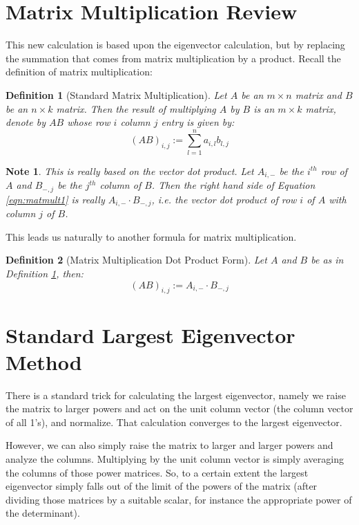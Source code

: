 \documentclass[12pt]{article}
\newtheorem{definition}{Definition}
\newtheorem{note}{Note}
\begin{document}
\section{Matrix Multiplication Review}
This new calculation is based upon the eigenvector calculation, but by replacing
the summation that comes from matrix multiplication by a product.  Recall
the definition of matrix multiplication:
\begin{definition}[Standard Matrix Multiplication]
\label{defn:matmult1}
Let $A$ be an $m \times n$ matrix and $B$ be an $n \times k$ matrix.  
Then the result of multiplying $A$ by $B$ is an $m \times k$ matrix,
denote by $AB$ whose row $i$ column $j$ entry is given by:
\begin{equation}
(AB)_{i,j} := \sum_{l=1}^{n} a_{i,l}b_{l,j}
\label{eqn:matmult1}	
\end{equation}
\end{definition}
\begin{note}
\label{note:matmultdot}
	This is really based on the vector dot product.  Let $A_{i,-}$
	be the $i^{th}$ row of $A$ and $B_{-,j}$ be the $j^{th}$ column of
	$B$.  Then the right hand side of Equation \ref{eqn:matmult1} is
	really $A_{i,-} \cdot B_{-,j}$, i.e. the vector dot product of
	row $i$ of $A$ with column $j$ of $B$.
\end{note}
This leads us naturally to another formula for matrix multiplication.

\begin{definition}[Matrix Multiplication Dot Product Form]
\label{defn:matmult2}
	Let $A$ and $B$ be as in Definition \ref{defn:matmult1}, then:
	$$(AB)_{i,j} := A_{i,-} \cdot B_{-,j}$$
\end{definition}

\section{Standard Largest Eigenvector Method}
There is a standard trick for calculating the largest eigenvector, namely
we raise the matrix to larger powers and act on the unit column vector (the
column vector of all 1's), and normalize.  That calculation converges
to the largest eigenvector.

However, we can also simply raise the matrix to larger and larger powers
and analyze the columns.  Multiplying by the unit column vector is simply
averaging the columns of those power matrices.
So, to a certain extent the largest eigenvector simply falls out of the
limit of the powers of the matrix (after dividing those matrices by a
suitable scalar, for instance the appropriate power of the determinant).
\end{document}

